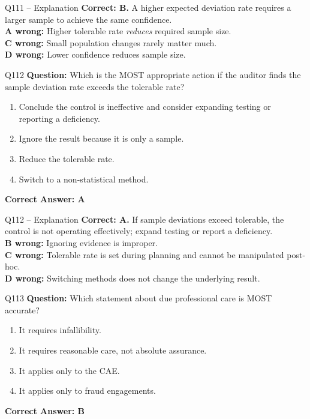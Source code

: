 \documentclass[aspectratio=169,10pt]{beamer}
\begin{document}
	\begin{frame}[t]{Q111 -- Explanation}
		\small
		\textbf{Correct: B.} A higher expected deviation rate requires a larger sample to achieve the same confidence. \\[4pt]
		\textbf{A wrong:} Higher tolerable rate \emph{reduces} required sample size. \\[2pt]
		\textbf{C wrong:} Small population changes rarely matter much. \\[2pt]
		\textbf{D wrong:} Lower confidence reduces sample size.
	\end{frame}
	
	\begin{frame}[t]{Q112}
		\small
		\textbf{Question:} Which is the MOST appropriate action if the auditor finds the sample deviation rate exceeds the tolerable rate?
		\begin{enumerate}[label=\Alph*.,itemsep=1pt,topsep=2pt]
			\item Conclude the control is ineffective and consider expanding testing or reporting a deficiency.
			\item Ignore the result because it is only a sample.
			\item Reduce the tolerable rate.
			\item Switch to a non-statistical method.
		\end{enumerate}
		\vspace{4pt}
		\textbf{Correct Answer: A}
	\end{frame}
	
	\begin{frame}[t]{Q112 -- Explanation}
		\small
		\textbf{Correct: A.} If sample deviations exceed tolerable, the control is not operating effectively; expand testing or report a deficiency. \\[4pt]
		\textbf{B wrong:} Ignoring evidence is improper. \\[2pt]
		\textbf{C wrong:} Tolerable rate is set during planning and cannot be manipulated post-hoc. \\[2pt]
		\textbf{D wrong:} Switching methods does not change the underlying result.
	\end{frame}
	
	\begin{frame}[t]{Q113}
		\small
		\textbf{Question:} Which statement about due professional care is MOST accurate?
		\begin{enumerate}[label=\Alph*.,itemsep=1pt,topsep=2pt]
			\item It requires infallibility.
			\item It requires reasonable care, not absolute assurance.
			\item It applies only to the CAE.
			\item It applies only to fraud engagements.
		\end{enumerate}
		\vspace{4pt}
		\textbf{Correct Answer: B}
	\end{frame}
	
\end{document}
